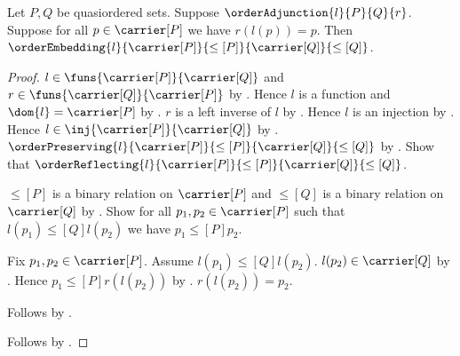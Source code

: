 \begin{proposition}\label{order_adjunction_left_embedding_of_unit_identity}
    Let $P,Q$ be quasiordered sets.
    Suppose $\orderAdjunction{l}{P}{Q}{r}$.
    Suppose for all $p\in\carrier[P]$ we have $r(l(p))=p$.
    Then $\orderEmbedding{l}{\carrier[P]}{\leq[P]}
        {\carrier[Q]}{\leq[Q]}$.
\end{proposition}
\begin{proof}
    $l\in\funs{\carrier[P]}{\carrier[Q]}$ and
        $r\in\funs{\carrier[Q]}{\carrier[P]}$ by
        .
    Hence $l$ is a function and $\dom{l}=\carrier[P]$ by
        .
    $r$ is a left inverse of $l$ by
        .
    Hence $l$ is an injection by .
    Hence $l\in\inj{\carrier[P]}{\carrier[Q]}$ by
        .
    $\orderPreserving{l}{\carrier[P]}{\leq[P]}
        {\carrier[Q]}{\leq[Q]}$ by
        .
    Show that $\orderReflecting{l}{\carrier[P]}{\leq[P]}
        {\carrier[Q]}{\leq[Q]}$.
    \begin{subproof}
        $\leq[P]$ is a binary relation on $\carrier[P]$ and
            $\leq[Q]$ is a binary relation on $\carrier[Q]$ by
            .
        Show for all $p_1,p_2\in\carrier[P]$ such that
            $l(p_1)\mathrel{\leq[Q]}l(p_2)$ we have
            $p_1\mathrel{\leq[P]}p_2$.
        \begin{subproof}
            Fix $p_1,p_2\in\carrier[P]$.
            Assume $l(p_1)\mathrel{\leq[Q]}l(p_2)$.
            $l(p_2)\in\carrier[Q]$ by .
            Hence $p_1\mathrel{\leq[P]}r(l(p_2))$ by
                .
            $r(l(p_2))=p_2$.
        \end{subproof}
        Follows by .
    \end{subproof}
    Follows by
        .
\end{proof}

